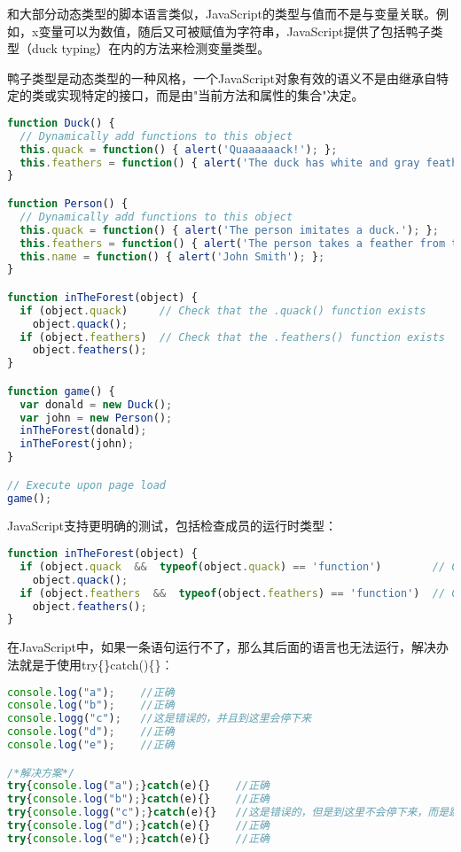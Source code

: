 和大部分动态类型的脚本语言类似，JavaScript的类型与值而不是与变量关联。例如，x变量可以为数值，随后又可被赋值为字符串，JavaScript提供了包括鸭子类型（duck typing）在内的方法来检测变量类型。

鸭子类型是动态类型的一种风格，一个JavaScript对象有效的语义不是由继承自特定的类或实现特定的接口，而是由"当前方法和属性的集合"决定。

\begin{lstlisting}[language=JavaScript]
function Duck() {
  // Dynamically add functions to this object
  this.quack = function() { alert('Quaaaaaack!'); };
  this.feathers = function() { alert('The duck has white and gray feathers.'); };
}

function Person() {
  // Dynamically add functions to this object
  this.quack = function() { alert('The person imitates a duck.'); };
  this.feathers = function() { alert('The person takes a feather from the ground and shows it.'); };
  this.name = function() { alert('John Smith'); };
}

function inTheForest(object) {
  if (object.quack)     // Check that the .quack() function exists
    object.quack();
  if (object.feathers)  // Check that the .feathers() function exists
    object.feathers();
}

function game() {
  var donald = new Duck();
  var john = new Person();
  inTheForest(donald);
  inTheForest(john);
}

// Execute upon page load
game();
\end{lstlisting}

JavaScript支持更明确的测试，包括检查成员的运行时类型：


\begin{lstlisting}[language=JavaScript]
function inTheForest(object) {
  if (object.quack  &&  typeof(object.quack) == 'function')        // Check that the .quack() function exists
    object.quack();
  if (object.feathers  &&  typeof(object.feathers) == 'function')  // Check that the .feathers() function exists
    object.feathers();
}
\end{lstlisting}

在JavaScript中，如果一条语句运行不了，那么其后面的语言也无法运行，解决办法就是于使用try\{\}catch()\{\}︰

\begin{lstlisting}[language=JavaScript]
console.log("a");    //正确
console.log("b");    //正确
console.logg("c");   //这是错误的，并且到这里会停下来
console.log("d");    //正确
console.log("e");    //正确

/*解决方案*/
try{console.log("a");}catch(e){}    //正确
try{console.log("b");}catch(e){}    //正确
try{console.logg("c");}catch(e){}   //这是错误的，但是到这里不会停下来，而是跳过
try{console.log("d");}catch(e){}    //正确
try{console.log("e");}catch(e){}    //正确
\end{lstlisting}



